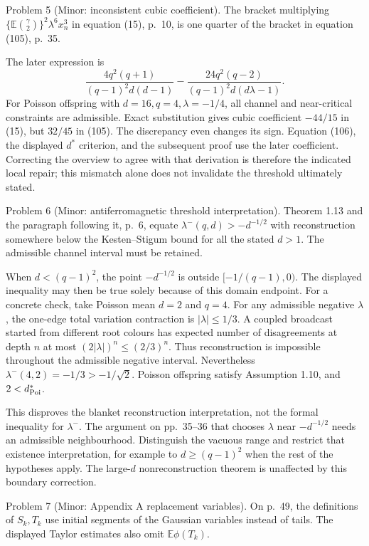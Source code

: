\documentclass[10pt]{article}
\begin{document}
Problem 5 (Minor: inconsistent cubic coefficient).  The bracket multiplying \(\{\mathbb E\binom{\gamma}{2}\}^2\lambda^6x_n^3\) in equation (15), p. 10, is one quarter of the bracket in equation (105), p. 35.\par
The later expression is \[\frac{4q^2(q+1)}{(q-1)^2d(d-1)}
 -\frac{24q^2(q-2)}{(q-1)^2d(d\lambda-1)}.\] For Poisson offspring with \(d=16,q=4,\lambda=-1/4\), all channel and near-critical constraints are admissible. Exact substitution gives cubic coefficient \(-44/15\) in (15), but \(32/45\) in (105). The discrepancy even changes its sign. Equation (106), the displayed \(d^*\) criterion, and the subsequent proof use the later coefficient. Correcting the overview to agree with that derivation is therefore the indicated local repair; this mismatch alone does not invalidate the threshold ultimately stated.\par
Problem 6 (Minor: antiferromagnetic threshold interpretation).  Theorem 1.13 and the paragraph following it, p. 6, equate \(\lambda^-(q,d)>-d^{-1/2}\) with reconstruction somewhere below the Kesten–Stigum bound for all the stated \(d>1\). The admissible channel interval must be retained.\par
When \(d<(q-1)^2\), the point \(-d^{-1/2}\) is outside \([-1/(q-1),0)\). The displayed inequality may then be true solely because of this domain endpoint. For a concrete check, take Poisson mean \(d=2\) and \(q=4\). For any admissible negative \(\lambda\), the one-edge total variation contraction is \(|\lambda|\leq1/3\). A coupled broadcast started from different root colours has expected number of disagreements at depth \(n\) at most \((2|\lambda|)^n\leq(2/3)^n\). Thus reconstruction is impossible throughout the admissible negative interval. Nevertheless \(\lambda^-(4,2)=-1/3>-1/\sqrt2\). Poisson offspring satisfy Assumption 1.10, and \(2<d^*_{\rm Poi}\).\par
This disproves the blanket reconstruction interpretation, not the formal inequality for \(\lambda^-\). The argument on pp. 35–36 that chooses \(\lambda\) near \(-d^{-1/2}\) needs an admissible neighbourhood. Distinguish the vacuous range and restrict that existence interpretation, for example to \(d\geq(q-1)^2\) when the rest of the hypotheses apply. The large-\(d\) nonreconstruction theorem is unaffected by this boundary correction.\par
Problem 7 (Minor: Appendix A replacement variables).  On p. 49, the definitions of \(S_k,T_k\) use initial segments of the Gaussian variables instead of tails. The displayed Taylor estimates also omit \(\mathbb E\phi(T_k)\).\par
\end{document}
